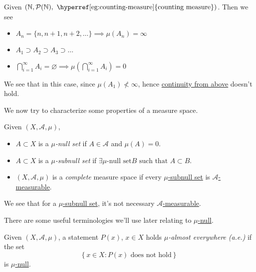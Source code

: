 \begin{eg}
  Given \(\left(\mathbb{\MakeUppercase{N}}, \mathcal{P} (\mathbb{\MakeUppercase{N}}), \text{ \hyperref[eg:counting-measure]{counting measure}}\right)\). Then we see
  \begin{itemize}
    \item \(A_{n} = \{n, n+1, n+2, \ldots  \} \implies \mu(A_{n}) = \infty \)
    \item \(A_1 \supset A_2\supset A_3\supset \ldots  \)
    \item \(\bigcap\limits_{i=1}^{\infty} A_{i} = \varnothing \implies \mu\left(\bigcap\limits_{i=1}^{\infty} A_{i}\right) = 0\)
  \end{itemize}
  \begin{remark}
    We see that in this case, since \(\mu(A_1)\nless \infty \), hence \hyperref[thm:measure-space-continuity-from-above]{continuity from above} doesn't hold.
  \end{remark}
\end{eg}

\hr

We now try to characterize some properties of a measure space.
\begin{definition}
  Given \((X, \mathcal{A} , \mu)\),
  \begin{itemize}
    \item\label{def:mu-null-set} \(A\subset X\) is a \emph{\(\mu\)-null set} if \(A\in \mathcal{A} \) and \(\mu(A) = 0\).
    \item\label{def:mu-subnull-set} \(A\subset X\) is a \emph{\(\mu\)-subnull set} if \(\exists \hyperref[def:mu-null-set]{\mu\text{-null set}} B \text{ such that }A\subset B\).
    \item\label{def:complete-measure-space} \((X, \mathcal{A} , \mu)\) is a \emph{complete} measure space if every \hyperref[def:mu-subnull-set]{\(\mu\)-subnull set} is \hyperref[def:measurable-set]{\(\mathcal{A}\)-measurable}.
  \end{itemize}
\end{definition}
\begin{note}
  We see that for a \hyperref[def:mu-subnull-set]{\(\mu\)-subnull set}, it's not necessary \hyperref[def:measurable-set]{\(\mathcal{A}\)-measurable}.
\end{note}

There are some useful terminologies we'll use later relating to \hyperref[def:mu-null-set]{\(\mu\)-null}.
\begin{definition}\label{def:mu-almost-everywhere}
  Given \((X, \mathcal{A} , \mu)\), a statement \(P(x)\), \(x\in X\) holds \emph{\(\mu\)-almost everywhere (a.e.)} if
  the set
  \[
    \left\{x\in X\colon P(x) \text{ does not hold} \right\}
  \]
  is \hyperref[def:mu-null-set]{\(\mu\)-null}.
\end{definition}


